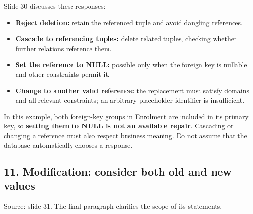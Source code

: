 Slide 30 discusses these responses:

\begin{itemize}
\tightlist
\item
  \textbf{Reject deletion:} retain the referenced tuple and avoid dangling references.
\item
  \textbf{Cascade to referencing tuples:} delete related tuples, checking whether further relations reference them.
\item
  \textbf{Set the reference to NULL:} possible only when the foreign key is nullable and other constraints permit it.
\item
  \textbf{Change to another valid reference:} the replacement must satisfy domains and all relevant constraints; an arbitrary placeholder identifier is insufficient.
\end{itemize}

In this example, both foreign-key groups in Enrolment are included in its primary key, so \textbf{setting them to NULL is not an available repair}. Cascading or changing a reference must also respect business meaning. Do not assume that the database automatically chooses a response.

\subsection{11. Modification: consider both old and new values}\label{03_relational_model_and_integrity_en-modification-consider-both-old-and-new-values}

Source: slide 31. The final paragraph clarifies the scope of its statements.

